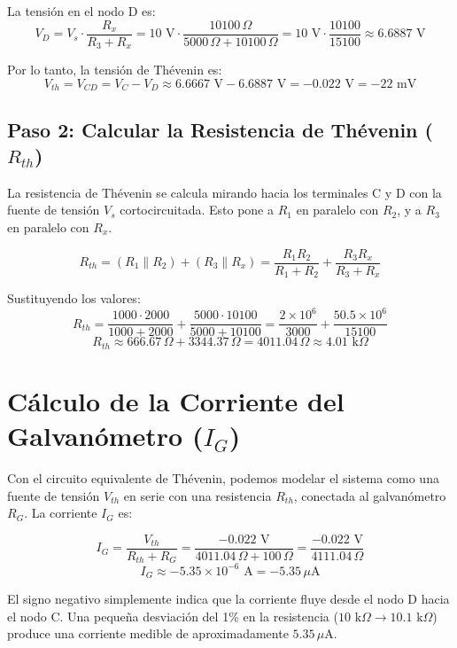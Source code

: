 \documentclass[12pt,a4paper]{article}
\begin{document}
La tensión en el nodo D es:
\[
V_D = V_s \cdot \frac{R_x}{R_3 + R_x} = 10 \text{ V} \cdot \frac{10100 \, \Omega}{5000 \, \Omega + 10100 \, \Omega} = 10 \text{ V} \cdot \frac{10100}{15100} \approx 6.6887 \text{ V}
\]

Por lo tanto, la tensión de Thévenin es:
\[
V_{th} = V_{CD} = V_C - V_D \approx 6.6667 \text{ V} - 6.6887 \text{ V} = -0.022 \text{ V} = -22 \text{ mV}
\]

\subsection{Paso 2: Calcular la Resistencia de Thévenin ($R_{th}$)}
La resistencia de Thévenin se calcula mirando hacia los terminales C y D con la fuente de tensión $V_s$ cortocircuitada. Esto pone a $R_1$ en paralelo con $R_2$, y a $R_3$ en paralelo con $R_x$.

\[
R_{th} = (R_1 \parallel R_2) + (R_3 \parallel R_x) = \frac{R_1 R_2}{R_1 + R_2} + \frac{R_3 R_x}{R_3 + R_x}
\]

Sustituyendo los valores:
\[
R_{th} = \frac{1000 \cdot 2000}{1000 + 2000} + \frac{5000 \cdot 10100}{5000 + 10100} = \frac{2 \times 10^6}{3000} + \frac{50.5 \times 10^6}{15100}
\]
\[
R_{th} \approx 666.67 \, \Omega + 3344.37 \, \Omega = 4011.04 \, \Omega \approx 4.01 \text{ k}\Omega
\]

\section{Cálculo de la Corriente del Galvanómetro ($I_G$)}

Con el circuito equivalente de Thévenin, podemos modelar el sistema como una fuente de tensión $V_{th}$ en serie con una resistencia $R_{th}$, conectada al galvanómetro $R_G$. La corriente $I_G$ es:

\[
I_G = \frac{V_{th}}{R_{th} + R_G} = \frac{-0.022 \text{ V}}{4011.04 \, \Omega + 100 \, \Omega} = \frac{-0.022 \text{ V}}{4111.04 \, \Omega}
\]
\[
I_G \approx -5.35 \times 10^{-6} \text{ A} = -5.35 \, \mu\text{A}
\]

El signo negativo simplemente indica que la corriente fluye desde el nodo D hacia el nodo C. Una pequeña desviación del 1\% en la resistencia ($10 \text{ k}\Omega \rightarrow 10.1 \text{ k}\Omega$) produce una corriente medible de aproximadamente $5.35 \, \mu\text{A}$.
\end{document}
